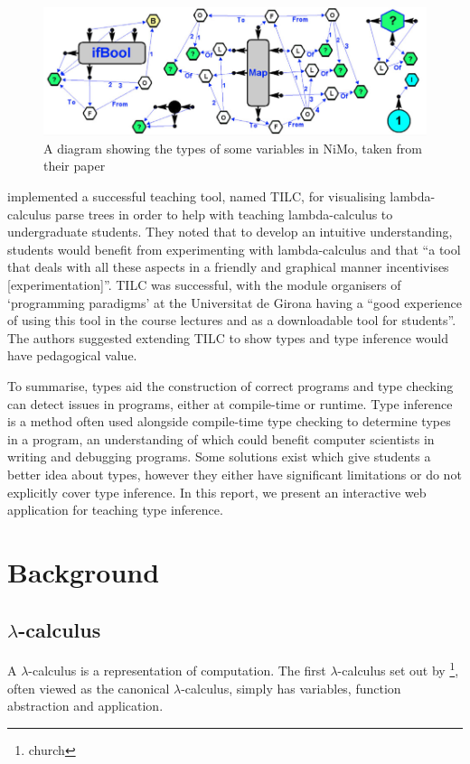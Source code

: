 \documentclass[a4paper,fleqn,12pt]{article}
\begin{document}
{\centering \begin{figure}[h!]
  \centering
  \includegraphics[width=0.960\linewidth]{images/image4.png}
  \caption{A diagram showing the types of some variables in NiMo, taken from their paper}
\end{figure} \par}

\cite{ref9} implemented a successful teaching tool, named TILC, for visualising lambda-calculus parse trees in order to help with teaching lambda-calculus to undergraduate students. They noted that to develop an intuitive understanding, students would benefit from  experimenting with lambda-calculus and that “a tool that deals with all these aspects in a friendly and graphical manner incentivises [experimentation]”. TILC was successful, with the module organisers of ‘programming paradigms’ at the Universitat de Girona having a “good experience of using this tool in the course lectures and as a downloadable tool for students”. The authors suggested extending TILC to show types and type inference would have pedagogical value.

To summarise, types aid the construction of correct programs and type checking can detect issues in programs, either at compile-time or runtime. Type inference is a method often used alongside compile-time type checking to determine types in a program, an understanding of which could benefit computer scientists in writing and debugging programs. Some solutions exist which give students a better idea about types, however they either have significant limitations or do not explicitly cover type inference. In this report, we present an interactive web application for teaching type inference.
\section{Background}\label{id:h.ebjyqi73zdyo}
\subsection{$\lambda$-calculus}\label{id:h.odw4vku9eizz}
A $\lambda$-calculus is a representation of computation. The first $\lambda$-calculus set out by \footnote{church}, often viewed as the canonical $\lambda$-calculus, simply has variables, function abstraction and application.
\end{document}
